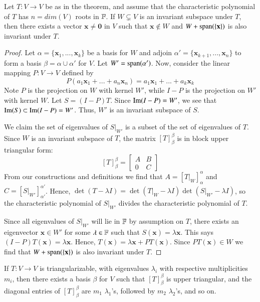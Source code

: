 \documentclass[12pt, a4paper, oneside, openright, titlepage]{book}
\newcommand{\mb}[1]{\mathbf{#1}}
\begin{document}
\begin{lem}
    Let $T:V\rightarrow V$ be as in the theorem, and assume that the characteristic polynomial of $T$ has $n = dim(V)$ roots in $\mathbb F$. If $W \subsetneq V$ is an invariant subspace under $T$, then there exists a vector $\mb x \neq \mb 0$ in $V$ such that $\mb x \notin W$ and $W + \spn(\{\mb x\})$ is also invariant under $T$.
\end{lem}
\begin{proof}
    Let $\alpha = \{\mb x_1,...,\mb x_k\}$ be a basis for $W$ and adjoin $\alpha' = \{\mb x_{k+1},...,\mb x_n\}$ to form a basis $\beta = \alpha \cup \alpha'$ for $V$. Let $W' = \operatorname{span}(\alpha')$. Now, consider the linear mapping $P:V \rightarrow V$ defined by $$P(a_1\mb x_1 + ... + a_n\mb x_n) = a_1 \mb x_1 + ... + a_k\mb x_k$$
    Note $P$ is the projection on $W$ with kernel $W'$, while $I - P$ is the projection on $W'$ with kernel $W$. Let $S = (I - P)T$. Since $\operatorname{Im}(I - P) = W'$, we see that $\operatorname{Im}(S) \subset \operatorname{Im}(I - P) = W'$. Thus, $W'$ is an invariant subspace of $S$. 
    
    We claim the set of eigenvalues of $S\rvert_{W'}$ is a subset of the set of eigenvalues of $T$. Since $W$ is an invariant subspace of $T$, the matrix $[T]_{\beta}^{\beta}$ is in block upper triangular form: $$[T]_{\beta}^{\beta} = \begin{bmatrix} A & B \\ 0 & C \end{bmatrix}$$ From our constructions and definitions we find that $A = [T\rvert_W]_{\alpha}^{\alpha}$ and $C = [S\rvert_{W'}]_{\alpha'}^{\alpha'}$. Hence, $\det(T-\lambda I) = \det(T\rvert_W - \lambda I)\det(S\rvert_{W'} - \lambda I)$, so the characteristic polynomial of $S\rvert_{W'}$ divides the characteristic polynomial of $T$.
    
    
    Since all eigenvalues of $S\rvert_{W'}$ will lie in $\mathbb F$ by assumption on $T$, there exists an eigenvector $\mb x \in W'$ for some $\lambda \in \mathbb F$ such that $S(\mb x) = \lambda \mb x$. This says $(I-P)T(\mb x) = \lambda\mb x$. Hence, $T(\mb x) = \lambda\mb x + PT(\mb x)$. Since $PT(\mb x) \in W$ we find that $W + \spn(\{\mb x\})$ is also invariant under $T$.
\end{proof}

\begin{cor}
    If $T:V\rightarrow V$ is triangularizable, with eigenvalues $\lambda_i$ with respective multiplicities $m_i$, then there exists a basis $\beta$ for $V$ such that $[T]_{\beta}^{\beta}$ is upper triangular, and the diagonal entries of $[T]_{\beta}^{\beta}$ are $m_1$ $\lambda_1$'s, followed by $m_2$ $\lambda_2$'s, and so on.
\end{cor}
\end{document}
